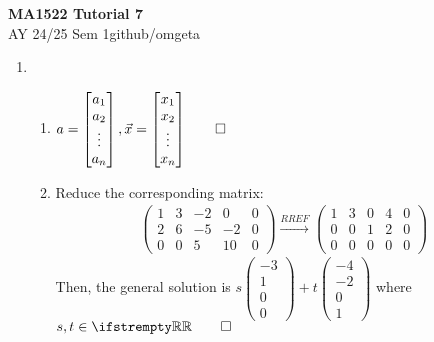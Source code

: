 \documentclass[12pt, a4paper]{article}
\newcommand{\mytitle}{MA1522 Tutorial 7}
\newcommand{\myauthor}{github/omgeta}
\newcommand{\mydate}{AY 24/25 Sem 1}
\begin{document}
\raggedright
\footnotesize
\begin{center}
{\normalsize{\textbf{\mytitle}}} \\
{\footnotesize{\mydate\hspace{2pt}\textemdash\hspace{2pt}\myauthor}}
\end{center}

\begin{enumerate}[Q\arabic*.]
  \item 
    \begin{enumerate}[(\alph*)]
      \item $a = \begin{bmatrix}a_1\\a_2\\\vdots\\a_n\end{bmatrix}, \vec{x}=\begin{bmatrix}x_1\\x_2\\\vdots\\x_n\end{bmatrix} \qed$
      \item Reduce the corresponding matrix:
        \begin{align*}
          \left(\begin{array}{ccccc} 1 & 3 & -2 & 0 & 0\\ 2 & 6 & -5 & -2 & 0\\ 0 & 0 & 5 & 10 & 0 \end{array}\right)
          \xrightarrow{RREF}
          \left(\begin{array}{ccccc} 1 & 3 & 0 & 4 & 0\\ 0 & 0 & 1 & 2 & 0\\ 0 & 0 & 0 & 0 & 0 \end{array}\right)
        \end{align*}
        Then, the general solution is $s\left(\begin{array}{c} -3\\ 1\\ 0\\ 0 \end{array}\right) + t\left(\begin{array}{c} -4\\ -2\\ 0\\ 1 \end{array}\right)$ where $s,t \in \RR \qed$


\end{enumerate}
\end{enumerate}
\end{document}
